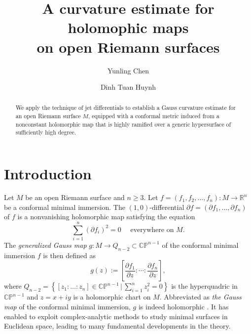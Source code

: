 \documentclass[english, 12pt]{amsart}
\theoremstyle{plain}
\theoremstyle{remark}
\numberwithin{equation}{section}
\theoremstyle{plain}
\theoremstyle{named}
\begin{document}
 
\title[A curvature estimate for holomophic maps]{\bf A curvature estimate for holomophic maps\\
	on open Riemann surfaces} 




\author{Yunling Chen}
\address{Academy of Mathematics and Systems Sciences, Chinese Academy of Sciences, Beijing 100190, China}

\author{Dinh Tuan Huynh}

\address{Department of Mathematics, University of Education, Hue University, 34 Le Loi St., Hue City, Vietnam}

\begin{abstract}
	We apply the technique of jet differentials to establish a Gauss curvature estimate for an open Riemann surface $M$, equipped with a conformal metric induced from a nonconstant holomorphic map that is highly ramified over a generic hypersurface of sufficiently high degree.
\end{abstract}

\maketitle

\section{Introduction}
Let $M$ be an open Riemann surface and $n\ge 3$. Let $f = (f_1, f_2,\ldots, f_n) \colon M\rightarrow \mathbb{R}^n$ be a conformal minimal immersion. The $(1, 0)$-differential $\partial f=(\partial f_1, \ldots, \partial f_n)$ of $f$ is a nonvanishing holomorphic map satisfying the equation
\[ \sum\limits_{i=1}^n \left(\partial f_i\right)^2=0 \quad \text{ everywhere on $M$}. \]
The \emph{generalized Gauss map} $g\colon M\rightarrow Q_{n-2}\subset\mathbb{CP}^{n-1}$ of the conformal minimal immersion $f$ is then defined as
$$
g(z):=\left[\frac{\partial f_1}{\partial z}: \cdots: \frac{\partial f_n}{\partial z}\right],
$$
where $Q_{n-2}=\left\{[z_1:\ldots:z_n]\in \mathbb{CP}^{n-1}\, \bigg|\, \sum\limits_{i=1}^n z_i^2=0 \right\}$ is the hyperquadric in $\mathbb{CP}^{n-1}$ and $z=x+iy$ is a holomorphic chart on $M$. Abbreviated as \emph{the Gauss map} of the conformal minimal immersion, $g$ is indeed holomorphic \cite{Fujimoto83_1}. It has enabled to exploit complex-analytic methods to study minimal surfaces in Euclidean space, leading to many fundamental developments in the theory.
\end{document}
